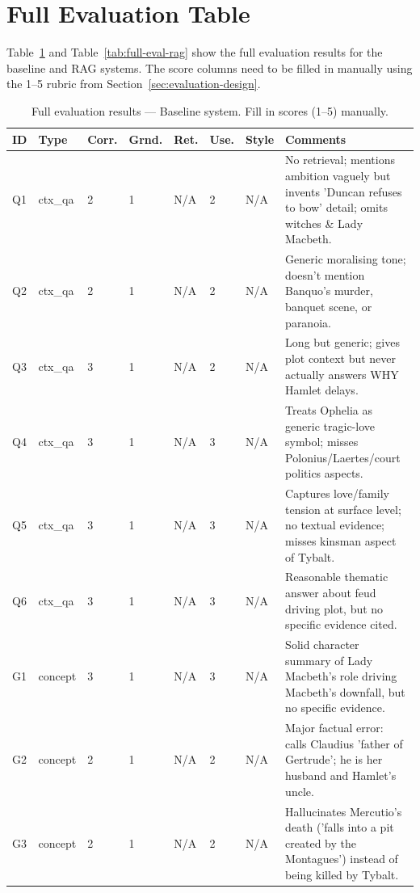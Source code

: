 \documentclass[10pt,conference]{IEEEtran}
\begin{document}
\appendices

\section{Full Evaluation Table}
\label{app:evaluation}

Table~\ref{tab:full-eval-baseline} and Table~\ref{tab:full-eval-rag} show the full evaluation results for the baseline and RAG systems. The score columns need to be filled in manually using the 1--5 rubric from Section~\ref{sec:evaluation-design}.

\begin{table}[h]
\centering
\caption{Full evaluation results --- Baseline system. Fill in scores (1--5) manually.}
\label{tab:full-eval-baseline}
\begin{tabularx}{\textwidth}{llp{1.5cm}p{1.2cm}p{1.2cm}p{1.2cm}p{1.2cm}X}
\toprule
ID & Type & Corr. & Grnd. & Ret. & Use. & Style & Comments \\
\midrule
Q1 & ctx\_qa & 2 & 1 & N/A & 2 & N/A & No retrieval; mentions ambition vaguely but invents 'Duncan refuses to bow' detail; omits witches \& Lady Macbeth. \\
Q2 & ctx\_qa & 2 & 1 & N/A & 2 & N/A & Generic moralising tone; doesn't mention Banquo's murder, banquet scene, or paranoia. \\
Q3 & ctx\_qa & 3 & 1 & N/A & 2 & N/A & Long but generic; gives plot context but never actually answers WHY Hamlet delays. \\
Q4 & ctx\_qa & 3 & 1 & N/A & 3 & N/A & Treats Ophelia as generic tragic-love symbol; misses Polonius/Laertes/court politics aspects. \\
Q5 & ctx\_qa & 3 & 1 & N/A & 3 & N/A & Captures love/family tension at surface level; no textual evidence; misses kinsman aspect of Tybalt. \\
Q6 & ctx\_qa & 3 & 1 & N/A & 3 & N/A & Reasonable thematic answer about feud driving plot, but no specific evidence cited. \\
G1 & concept & 3 & 1 & N/A & 3 & N/A & Solid character summary of Lady Macbeth's role driving Macbeth's downfall, but no specific evidence. \\
G2 & concept & 2 & 1 & N/A & 2 & N/A & Major factual error: calls Claudius 'father of Gertrude'; he is her husband and Hamlet's uncle. \\
G3 & concept & 2 & 1 & N/A & 2 & N/A & Hallucinates Mercutio's death ('falls into a pit created by the Montagues') instead of being killed by Tybalt. \\

\end{tabularx}
\end{table}
\end{document}
